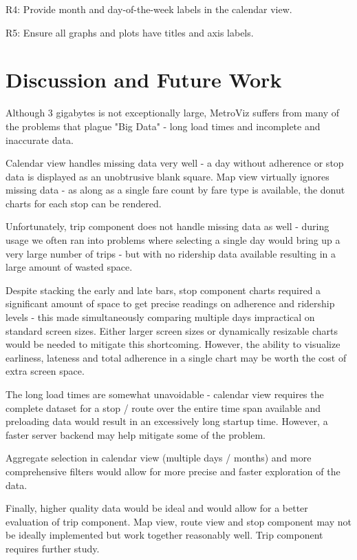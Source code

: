 \documentclass[journal]{vgtc}                %
\begin{document}
R4: Provide month and day-of-the-week labels in the calendar view. 

R5: Ensure all graphs and plots have titles and axis labels.

\section{Discussion and Future Work}
Although 3 gigabytes is not exceptionally large, MetroViz suffers from many of the problems that plague "Big Data" - long load times and incomplete and inaccurate data.

Calendar view handles missing data very well - a day without adherence or stop data is displayed as an unobtrusive blank square. Map view virtually ignores missing data - as along as a single fare count by fare type is available, the donut charts for each stop can be rendered.

Unfortunately, trip component does not handle missing data as well - during usage we often ran into problems where selecting a single day would bring up a very large number of trips - but with no ridership data available resulting in a large amount of wasted space. 

Despite stacking the early and late bars, stop component charts required a significant amount of space to get precise readings on adherence and ridership levels - this made simultaneously comparing multiple days impractical on standard screen sizes. Either larger screen sizes or dynamically resizable charts would be needed to mitigate this shortcoming. However, the ability to visualize earliness, lateness and total adherence in a single chart may be worth the cost of extra screen space.

The long load times are somewhat unavoidable - calendar view requires the complete dataset for a stop / route over the entire time span available and preloading data would result in an excessively long startup time. However, a faster server backend may help mitigate some of the problem.

Aggregate selection in calendar view (multiple days / months) and more comprehensive filters would allow for more precise and faster exploration of the data.

Finally, higher quality data would be ideal and would allow for a better evaluation of trip component. Map view, route view and stop component may not be ideally implemented but work together reasonably well. Trip component requires further study.





\end{document}
